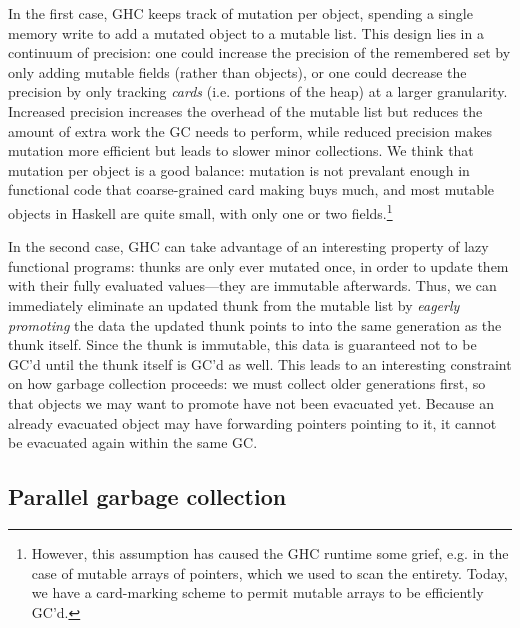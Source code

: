 In the first case, GHC keeps track of mutation per object, spending a
single memory write to add a mutated object to a mutable list.  This
design lies in a continuum of precision: one could increase the
precision of the remembered set by only adding mutable fields (rather
than objects), or one could decrease the precision by only tracking
\emph{cards} (i.e. portions of the heap) at a larger granularity.
Increased precision increases the overhead of the mutable list but
reduces the amount of extra work the GC needs to perform, while reduced
precision makes mutation more efficient but leads to slower minor
collections.  We think that mutation per object is a good balance: mutation
is not prevalant enough in functional code that coarse-grained card making
buys much, and most mutable objects in Haskell are quite small, with only
one or two fields.\footnote{However, this assumption has caused the GHC runtime
some grief, e.g. in the case of mutable arrays of pointers, which we used to
scan the entirety.  Today, we have a card-marking scheme to permit mutable
arrays to be efficiently GC'd.}

In the second case, GHC can take advantage of an interesting property of
lazy functional programs: thunks are only ever mutated once, in order to
update them with their fully evaluated values---they are immutable
afterwards.  Thus, we can immediately eliminate an updated thunk from
the mutable list by \emph{eagerly promoting} the data the updated thunk
points to into the same generation as the thunk itself.  Since the thunk
is immutable, this data is guaranteed not to be GC'd until the thunk
itself is GC'd as well.  This leads to an interesting constraint on how
garbage collection proceeds: we must collect older generations first, so
that objects we may want to promote have not been evacuated yet.
Because an already evacuated object may have forwarding pointers
pointing to it, it cannot be evacuated again within the same GC.



\subsection{Parallel garbage collection}
\label{sec:parallel-gc}

